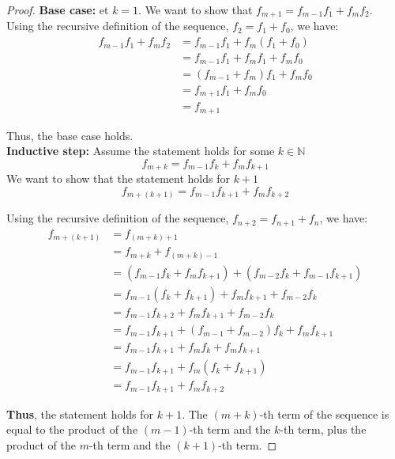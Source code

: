 \documentclass[12pt]{article}
\begin{document}
\begin{proof}
  \textbf{Base case:} et $k=1$. We want to show that $f_{m+1} = f_{m-1}f_1 + f_m f_{2}$. \\
  Using the recursive definition of the sequence, $f_2 = f_1 + f_0$, we have:
  \begin{align*}
    f_{m-1}f_1 + f_m f_{2} & = f_{m-1}f_1 + f_m (f_1 + f_0)   \\
                           & = f_{m-1}f_1 + f_m f_1 + f_m f_0 \\
                           & = (f_{m-1} + f_m)f_1 + f_m f_0   \\
                           & = f_{m+1}f_1 + f_m f_0           \\
                           & = f_{m+1}
  \end{align*}

  Thus, the base case holds.\\

  \noindent \textbf{Inductive step:} Assume the statement holds for some $k \in \mathbb{N}$
  \[
    f_{m+k} = f_{m-1}f_k + f_m f_{k+1}
  \]
  We want to show that the statement holds for $k+1$
  \[
    f_{m+(k+1)} = f_{m-1}f_{k+1} + f_m f_{k+2}
  \]

  \noindent Using the recursive definition of the sequence, $f_{n+2} = f_{n+1} + f_n$, we have:
  \begin{align*}
    f_{m+(k+1)} & = f_{(m+k)+1}                                                \\
                & = f_{m+k} + f_{(m+k)-1}                                      \\
                & = (f_{m-1}f_k + f_m f_{k+1}) + (f_{m-2}f_k + f_{m-1}f_{k+1}) \\
                & = f_{m-1}(f_k + f_{k+1}) + f_m f_{k+1} + f_{m-2}f_k          \\
                & = f_{m-1}f_{k+2} + f_m f_{k+1} + f_{m-2}f_k                  \\
                & = f_{m-1}f_{k+1} + (f_{m-1} + f_{m-2})f_k + f_m f_{k+1}      \\
                & = f_{m-1}f_{k+1} + f_m f_k + f_m f_{k+1}                     \\
                & = f_{m-1}f_{k+1} + f_m(f_k + f_{k+1})                        \\
                & = f_{m-1}f_{k+1} + f_m f_{k+2}
  \end{align*}

  \noindent \textbf{Thus}, the statement holds for $k+1$. The $(m+k)$-th term of the sequence is equal to the product of the $(m-1)$-th term and the $k$-th term, plus the product of the $m$-th term and the $(k+1)$-th term.
\end{proof}
\end{document}
